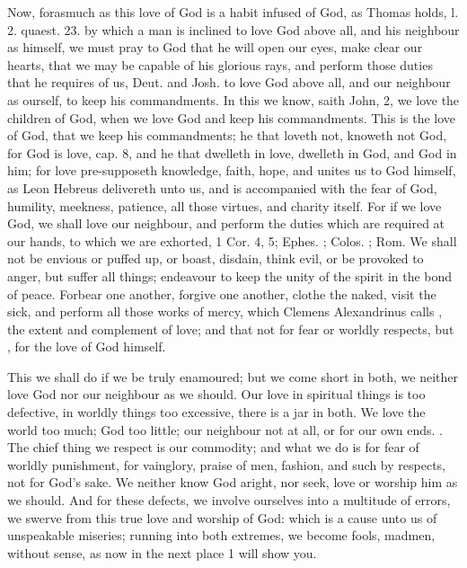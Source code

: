 {Now, forasmuch as this love of God is a habit infused of God, as 
Thomas holds, \textlatin{l. 2. quaest. 23.} by which a man is inclined to love God
above all, and his neighbour as himself, we must pray to God that he
will open our eyes, make clear our hearts, that we may be capable of
his glorious rays, and perform those duties that he requires of us,
Deut.  and Josh.  to love God above all, and our neighbour as
ourself, to keep his commandments. In this we know, saith John,  
2, we love the children of God, when we love God and keep his
commandments. This is the love of God, that we keep his commandments;
he that loveth not, knoweth not God, for God is love, cap.  8, and
he that dwelleth in love, dwelleth in God, and God in him; for love
pre-supposeth knowledge, faith, hope, and unites us to God himself, as
Leon Hebreus delivereth unto us, and is accompanied with the fear
of God, humility, meekness, patience, all those virtues, and charity
itself. For if we love God, we shall love our neighbour, and perform
the duties which are required at our hands, to which we are exhorted, 1
Cor.  4, 5; Ephes. ; Colos. ; Rom.  We shall not be
envious or puffed up, or boast, disdain, think evil, or be provoked to
anger, but suffer all things; endeavour to keep the unity of the spirit
in the bond of peace. Forbear one another, forgive one another, clothe
the naked, visit the sick, and perform all those works of mercy, which
Clemens Alexandrinus calls , the extent and complement of love; and that not for fear
or worldly respects, but , for the love of God himself.

This we shall do if we be truly enamoured; but we come short in both,
we neither love God nor our neighbour as we should. Our love in
spiritual things is too defective, in worldly things too
excessive, there is a jar in both. We love the world too much; God too
little; our neighbour not at all, or for our own ends. . The chief thing we respect is our commodity; and what
we do is for fear of worldly punishment, for vainglory, praise of men,
fashion, and such by respects, not for God's sake. We neither know God
aright, nor seek, love or worship him as we should. And for these
defects, we involve ourselves into a multitude of errors, we swerve
from this true love and worship of God: which is a cause unto us of
unspeakable miseries; running into both extremes, we become fools,
madmen, without sense, as now in the next place 1 will show you.

}
